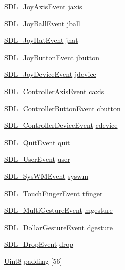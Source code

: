 \begin{DoxyCompactItemize}
\item 
\hyperlink{struct_s_d_l___joy_axis_event}{S\-D\-L\-\_\-\-Joy\-Axis\-Event} \hyperlink{union_s_d_l___event_ac4611acd0e9c675e67dc20919f0accb4}{jaxis}
\item 
\hyperlink{struct_s_d_l___joy_ball_event}{S\-D\-L\-\_\-\-Joy\-Ball\-Event} \hyperlink{union_s_d_l___event_ae433f511e3383d17f8fe02df745ee8f8}{jball}
\item 
\hyperlink{struct_s_d_l___joy_hat_event}{S\-D\-L\-\_\-\-Joy\-Hat\-Event} \hyperlink{union_s_d_l___event_a421b40e0f8e01f181c8d5548cff1dd1d}{jhat}
\item 
\hyperlink{struct_s_d_l___joy_button_event}{S\-D\-L\-\_\-\-Joy\-Button\-Event} \hyperlink{union_s_d_l___event_a591104d64903ae1cf70874fb5d3124ff}{jbutton}
\item 
\hyperlink{struct_s_d_l___joy_device_event}{S\-D\-L\-\_\-\-Joy\-Device\-Event} \hyperlink{union_s_d_l___event_a17514dc19a846ea1b5fbe44123700c4c}{jdevice}
\item 
\hyperlink{struct_s_d_l___controller_axis_event}{S\-D\-L\-\_\-\-Controller\-Axis\-Event} \hyperlink{union_s_d_l___event_aa8f6df0f2716fae56204b12ab4a4c289}{caxis}
\item 
\hyperlink{struct_s_d_l___controller_button_event}{S\-D\-L\-\_\-\-Controller\-Button\-Event} \hyperlink{union_s_d_l___event_aee2b5671c8dcdb447023715cc21593cb}{cbutton}
\item 
\hyperlink{struct_s_d_l___controller_device_event}{S\-D\-L\-\_\-\-Controller\-Device\-Event} \hyperlink{union_s_d_l___event_ad3beed01e690b885728e0b0e1d636378}{cdevice}
\item 
\hyperlink{struct_s_d_l___quit_event}{S\-D\-L\-\_\-\-Quit\-Event} \hyperlink{union_s_d_l___event_a102a3008afe67a1c02ae7504e232dcef}{quit}
\item 
\hyperlink{struct_s_d_l___user_event}{S\-D\-L\-\_\-\-User\-Event} \hyperlink{union_s_d_l___event_ab7c394e3ce7bf1e4f8d68bc0e9f1b042}{user}
\item 
\hyperlink{struct_s_d_l___sys_w_m_event}{S\-D\-L\-\_\-\-Sys\-W\-M\-Event} \hyperlink{union_s_d_l___event_ab3b2eaf5348d4c50a51b1f297fdef537}{syswm}
\item 
\hyperlink{struct_s_d_l___touch_finger_event}{S\-D\-L\-\_\-\-Touch\-Finger\-Event} \hyperlink{union_s_d_l___event_ab18d7d60794cb056948ffa58541bc3c5}{tfinger}
\item 
\hyperlink{struct_s_d_l___multi_gesture_event}{S\-D\-L\-\_\-\-Multi\-Gesture\-Event} \hyperlink{union_s_d_l___event_ac19b3c6a6b5181a51eb4fbe2cbe726a9}{mgesture}
\item 
\hyperlink{struct_s_d_l___dollar_gesture_event}{S\-D\-L\-\_\-\-Dollar\-Gesture\-Event} \hyperlink{union_s_d_l___event_a4481167b9f8549aeb254e97ca812e74d}{dgesture}
\item 
\hyperlink{struct_s_d_l___drop_event}{S\-D\-L\-\_\-\-Drop\-Event} \hyperlink{union_s_d_l___event_acff77bccbca65abbb876360a3f5209c9}{drop}
\item 
\hyperlink{_s_d_l__stdinc_8h_a2944638813a090aa23e62f4da842c3e2}{Uint8} \hyperlink{union_s_d_l___event_aabb599570edfa54aad6255c1f24f2ad2}{padding} \mbox{[}56\mbox{]}
\end{DoxyCompactItemize}



